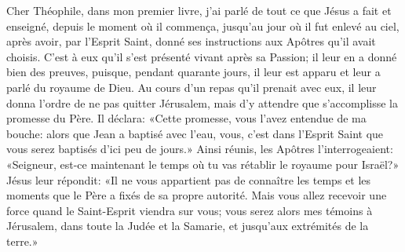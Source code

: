 Cher Théophile, dans mon premier livre,
	j’ai parlé de tout ce que Jésus a fait et enseigné,
	depuis le moment où il commença,
	jusqu’au jour où il fut enlevé au ciel, après avoir, par l’Esprit Saint,
	donné ses instructions aux Apôtres qu’il avait choisis.
C’est à eux qu’il s’est présenté vivant après sa Passion;
	il leur en a donné bien des preuves, puisque, pendant quarante jours,
	il leur est apparu et leur a parlé du royaume de Dieu.
Au cours d’un repas qu’il prenait avec eux,
	il leur donna l’ordre de ne pas quitter Jérusalem,
	mais d’y attendre que s’accomplisse la promesse du Père.
Il déclara: «Cette promesse, vous l’avez entendue de ma bouche:
	alors que Jean a baptisé avec l’eau,
	vous, c’est dans l’Esprit Saint que vous serez baptisés d’ici peu de jours.»
Ainsi réunis, les Apôtres l’interrogeaient:
	«Seigneur, est-ce maintenant le temps où tu vas rétablir le royaume pour Israël?»
Jésus leur répondit: «Il ne vous appartient pas de connaître les temps et les moments
	que le Père a fixés de sa propre autorité.
Mais vous allez recevoir une force quand le Saint-Esprit viendra sur vous;
	vous serez alors mes témoins à Jérusalem,
	dans toute la Judée et la Samarie, et jusqu’aux extrémités de la terre.»
